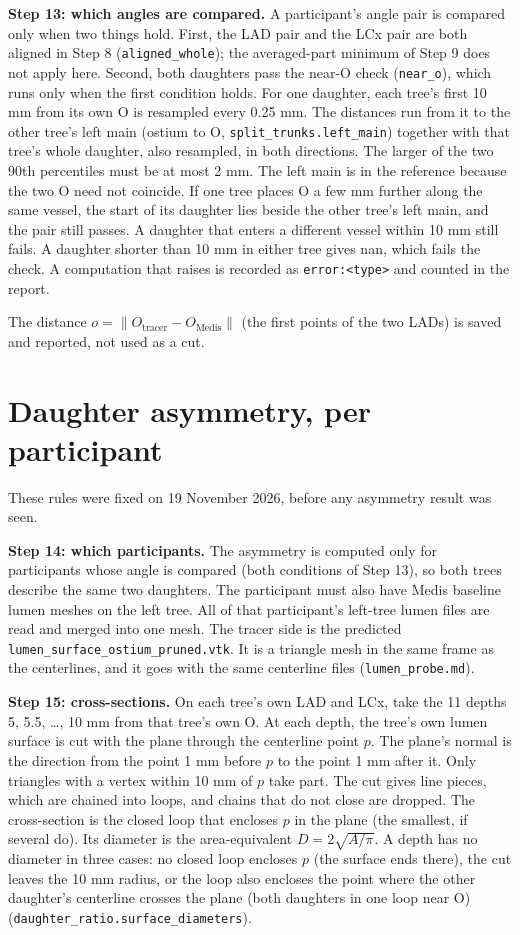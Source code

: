 \documentclass[11pt,a4paper]{article}
\newcommand{\code}[1]{\texttt{#1}}
\begin{document}
\textbf{Step 13: which angles are compared.} A participant's angle pair is compared only when two things
hold. First, the LAD pair and the LCx pair are both aligned in Step 8 (\code{aligned\_whole}); the
averaged-part minimum of Step 9 does not apply here. Second, both daughters pass the near-O check
(\code{near\_o}), which runs only when the first condition holds. For one daughter, each tree's first
10 mm from its own O is resampled every 0.25 mm. The distances run from it to the other tree's left main
(ostium to O, \code{split\_trunks.left\_main}) together with that tree's whole daughter, also resampled, in
both directions. The larger of the two 90th percentiles must be at most 2 mm. The left main is in the
reference because the two O need not coincide. If one tree places O a few mm further along the same vessel,
the start of its daughter lies beside the other tree's left main, and the pair still passes. A daughter
that enters a different vessel within 10 mm still fails. A daughter shorter than 10 mm in either tree gives
nan, which fails the check. A computation that raises is recorded as \code{error:<type>} and counted in
the report.

The distance $o=\lVert O_{\text{tracer}}-O_{\text{Medis}}\rVert$ (the first points of the two LADs) is
saved and reported, not used as a cut.

\section{Daughter asymmetry, per participant}

These rules were fixed on 19 November 2026, before any asymmetry result was seen.

\textbf{Step 14: which participants.} The asymmetry is computed only for participants whose angle is
compared (both conditions of Step 13), so both trees describe the same two daughters. The participant must
also have Medis baseline lumen meshes on the left tree. All of that participant's left-tree lumen files are
read and merged into one mesh. The tracer side is the predicted \code{lumen\_surface\_ostium\_pruned.vtk}.
It is a triangle mesh in the same frame as the centerlines, and it goes with the same centerline files
(\code{lumen\_probe.md}).

\textbf{Step 15: cross-sections.} On each tree's own LAD and LCx, take the 11 depths 5, 5.5, \dots, 10 mm
from that tree's own O. At each depth, the tree's own lumen surface is cut with the plane through the
centerline point $p$. The plane's normal is the direction from the point 1 mm before $p$ to the point 1 mm
after it. Only triangles with a vertex within 10 mm of $p$ take part. The cut gives line pieces, which are
chained into loops, and chains that do not close are dropped. The cross-section is the closed loop that
encloses $p$ in the plane (the smallest, if several do). Its diameter is the area-equivalent
$D=2\sqrt{A/\pi}$. A depth has no diameter in three cases: no closed loop encloses $p$ (the surface ends
there), the cut leaves the 10 mm radius, or the loop also encloses the point where the other daughter's
centerline crosses the plane (both daughters in one loop near O)
(\code{daughter\_ratio.surface\_diameters}).
\end{document}
